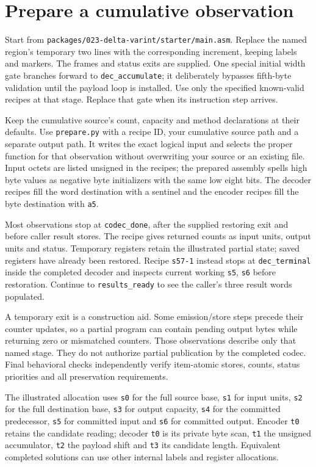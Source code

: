 \section{Prepare a cumulative observation}
Start from \texttt{packages/023-delta-varint/starter/main.asm}. Replace the named region's
temporary two lines with the corresponding increment, keeping labels and markers.
The frames and status exits are supplied. One special initial width gate branches
forward to \texttt{dec\_accumulate}; it deliberately bypasses fifth-byte validation
until the payload loop is installed. Use only the specified known-valid recipes at
that stage. Replace that gate when its instruction step arrives.

Keep the cumulative source's count, capacity and method declarations at their defaults.
Use \texttt{prepare.py} with a recipe ID, your cumulative source path and a separate
output path. It writes the exact logical input and selects the proper function for
that observation without overwriting your source or an existing file. Input octets
are listed unsigned in the recipes; the prepared assembly spells high byte values
as negative byte initializers with the same low eight bits. The decoder recipes fill
the word destination with a sentinel and the encoder recipes fill the byte destination
with \texttt{a5}.

Most observations stop at \texttt{codec\_done}, after the supplied restoring exit
and before caller result stores. The recipe gives returned counts as input units,
output units and status. Temporary registers retain the illustrated partial state;
saved registers have already been restored. Recipe \texttt{s57-1} instead stops at
\texttt{dec\_terminal} inside the completed decoder and inspects current working
\texttt{s5}, \texttt{s6} before restoration. Continue to \texttt{results\_ready} to
see the caller's three result words populated.

A temporary exit is a construction aid. Some emission/store steps precede their
counter updates, so a partial program can contain pending output bytes while returning
zero or mismatched counters. Those observations describe only that named stage.
They do not authorize partial publication by the completed codec. Final behavioral
checks independently verify item-atomic stores, counts, status priorities and all
preservation requirements.

The illustrated allocation uses \texttt{s0} for the full source base, \texttt{s1} for
input units, \texttt{s2} for the full destination base, \texttt{s3} for output capacity,
\texttt{s4} for the committed predecessor, \texttt{s5} for committed input and
\texttt{s6} for committed output. Encoder \texttt{t0} retains the candidate reading;
decoder \texttt{t0} is its private byte scan, \texttt{t1} the unsigned accumulator,
\texttt{t2} the payload shift and \texttt{t3} its candidate length. Equivalent completed
solutions can use other internal labels and register allocations.
